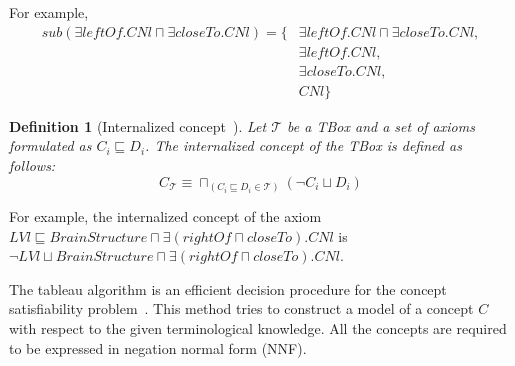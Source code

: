 \documentclass{article}
\newtheorem{mydef}{Definition}
\begin{document}
For example, 
 \begin{align*}
 sub(\exists leftOf.CNl \sqcap \exists closeTo.CNl)=\{&\exists leftOf.CNl \sqcap \exists closeTo.CNl,\\
 &\exists leftOf.CNl,\\
 &\exists closeTo.CNl,\\
 &CNl\}
 \end{align*}
 
\begin{mydef}[Internalized concept~\cite{baader2003description}]
Let $\mathcal{T}$ be a TBox and a set of axioms formulated as $C_i \sqsubseteq D_i$. The internalized concept of the TBox is defined as follows:
$$C_\mathcal{T} \equiv \sqcap_{(C_i \sqsubseteq D_i\in \mathcal{T})} (\neg C_i \sqcup D_i) $$
\label{def:ic}
\end{mydef}
For example, the internalized concept of the axiom $LVl \sqsubseteq BrainStructure \sqcap \exists (rightOf \sqcap closeTo). CNl$ is
$\neg LVl \sqcup BrainStructure \sqcap \exists (rightOf \sqcap closeTo). CNl$.

The tableau algorithm is an efficient decision procedure for the concept satisfiability problem~\cite{baader2001overview,gore2007exptime,nguyen2009efficient}.
This method tries to construct a model of a concept $C$ with respect to the given terminological knowledge. 
All the concepts are required to be expressed in negation normal form (NNF). 
\end{document}
